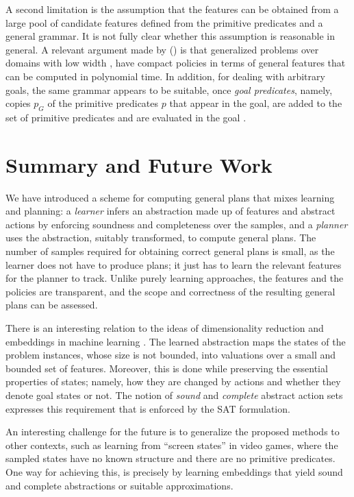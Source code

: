 \documentclass[letterpaper]{article} %
\newcommand{\citeay}[1]{\citeauthor{#1} (\citeyear{#1})}
\begin{document}
A second limitation is the assumption that 
the features can be obtained from a large pool of candidate  features defined 
from the primitive predicates and a  general grammar.
It is not fully clear whether this assumption is reasonable in general.
A relevant argument made by \citeay{bonet:ijcai2018} is that generalized problems
over domains with low width \cite{nir:ecai2012}, have compact policies
in terms of general features that can be computed in polynomial time.
In addition, for dealing with arbitrary goals, the same grammar  appears
to be suitable, once  \emph{goal predicates}, namely, copies $p_G$ of the  primitive predicates $p$
that appear in the goal,  are added to the set of primitive predicates and are evaluated in the goal
\cite{martin-geffner:generalized}. 

\section{Summary and Future Work}

We have introduced a scheme for computing general plans that mixes
learning and planning: a \emph{learner} infers an abstraction made
up of features and abstract actions by enforcing %
soundness and completeness over the samples, and a \emph{planner}
uses the abstraction, suitably transformed, to compute general plans. 
The number of samples required for obtaining correct general plans is
small, as the learner does not have to produce plans; it just
has to learn the relevant features for the planner to track.
Unlike purely learning approaches, the features and the policies
are transparent, and the scope and correctness
of the resulting general plans can be assessed.

There is  an interesting  relation to the ideas
of dimensionality reduction and embeddings in machine learning
\cite{hamilton:embeddings}. The learned abstraction
maps the  states of the problem instances, 
whose size is not bounded, into valuations over a small and bounded
set of features. Moreover,  this is done while preserving the   essential properties
of states; namely,  how they are changed by actions and whether they denote  goal states or not.
The notion of \emph{sound} and \emph{complete} abstract action sets expresses this requirement
that is enforced by  the SAT formulation.

An interesting challenge for the future  is to generalize the proposed methods
to other contexts, such as learning from ``screen states'' in video games,
where the sampled states have no known structure and there are no primitive
predicates. One way for achieving this, is precisely by learning embeddings
that yield sound and complete abstractions or suitable approximations.
\end{document}
